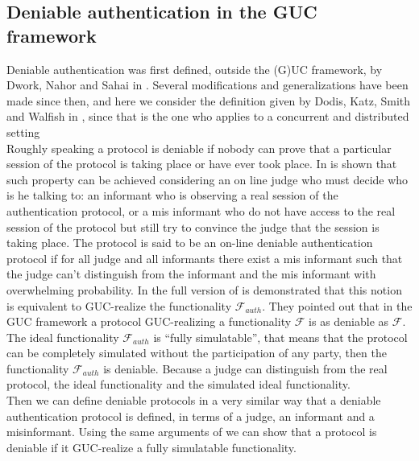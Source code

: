 \documentclass{acm_proc_article-sp}
\begin{document}
\subsection{Deniable authentication in the GUC framework}
Deniable authentication was first defined, outside the (G)UC framework, by Dwork, Nahor and Sahai in
\cite{DwoNaoSah04}. Several modifications and generalizations have been made since then, and here we consider
the definition given by Dodis, Katz, Smith and Walfish in \cite{conf/tcc/DodisKSW09}, since that is the one who
applies to a concurrent and distributed setting\\
Roughly speaking a protocol is deniable if nobody can prove that a particular session of
the protocol is taking place or have ever took place. In \cite{conf/tcc/DodisKSW09} is shown that such property
can be achieved considering an on line judge who must decide who is he talking to: an informant who is observing
a real session of the authentication protocol, or a mis informant who do not have access to the real session of
the protocol but still try to convince the judge that the session is taking place. The protocol is said to be
an on-line deniable authentication protocol if for all judge and all informants there exist a mis informant such that
the judge can't distinguish from the informant and the mis informant with overwhelming probability. In the
full version of \cite{conf/tcc/DodisKSW09} is demonstrated that this notion is equivalent to GUC-realize the
functionality $\mathcal{F}_{auth}$. They pointed out that in the GUC framework a protocol GUC-realizing
a functionality $\mathcal{F}$ is as deniable as $\mathcal{F}$. The ideal functionality $\mathcal{F}_{auth}$ is
``fully simulatable'', that means that the protocol can be completely simulated without the participation
of any party, then the functionality $\mathcal{F}_{auth}$ is deniable. Because a judge can distinguish
from the real protocol, the ideal functionality and the simulated ideal functionality.\\
Then we can define deniable protocols in a very similar way that a deniable authentication protocol is defined,
in terms of a judge, an informant and a misinformant.
Using the same arguments of \cite{conf/tcc/DodisKSW09} we can show  that a protocol is deniable if it
GUC-realize a fully simulatable functionality.
\end{document}
